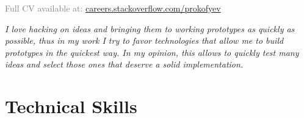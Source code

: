 \documentclass[11pt,a4paper]{moderncv}
\begin{document}
\textcolor{grey}{Full CV available at: \href{http://careers.stackoverflow.com/prokofyev}{careers.stackoverflow.com/prokofyev}}\\
\maketitle

{\large\textit{I love hacking on ideas and bringing them to working prototypes as quickly as possible, thus in my work I try to favor technologies that allow me to build prototypes in the quickest way. In my opinion, this allows to quickly test many ideas and select those ones that deserve a solid implementation.}}
\vspace{0.5cm}

\section{Technical Skills}

\end{document}

